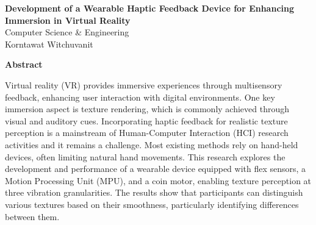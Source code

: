 \documentclass[uplatex,
12pt, %
a4paper,
english, %
oneside,
titlepage,
singlespacing, %
liststotoc, %
headsepline,
]{MastersDoctoralThesis} %
\begin{document}


\begin{center}
    \vspace*{1cm} %

    {\Large \textbf{Development of a Wearable Haptic Feedback Device for Enhancing Immersion in Virtual Reality}} \\ %
    \vspace{1.5cm} %
    {Computer Science \& Engineering} \\ %
    {Korntawat Witchuvanit} \\ %

    \vspace*{2cm} %
\end{center}

\begin{center}
    \textbf{Abstract} %
\end{center}
\vspace{0.5cm} %

Virtual reality (VR) provides immersive experiences through multisensory feedback, enhancing user interaction with digital environments. One key immersion aspect is texture rendering, which is commonly achieved through visual and auditory cues. Incorporating haptic feedback for realistic texture perception is a mainstream of Human-Computer Interaction (HCI) research activities and it remains a challenge. Most existing methods rely on hand-held devices, often limiting natural hand movements. This research explores the development and performance of a wearable device equipped with flex sensors, a Motion Processing Unit (MPU), and a coin motor, enabling texture perception at three vibration granularities. The results show that participants can distinguish various textures based on their smoothness, particularly identifying differences between them.

\vspace{5mm} %
\end{document}

